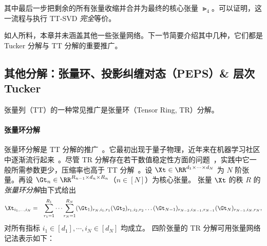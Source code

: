 其中最后一步把剩余的所有张量收缩并合并为最终的核心张量 $\Gt_4$。可以证明，这一流程与执行 TT-SVD \emph{完全}等价。

如人所料，本章并未涵盖其他一些张量网络。下一节简要介绍其中几种，它们都是 Tucker 分解与 TT 分解的重要推广。
\subsection{其他分解：张量环、投影纠缠对态（PEPS）\& 层次 Tucker}

张量列（TT）的一种常见推广是张量环（Tensor Ring, TR）分解。
\paragraph{张量环分解}
张量环分解是 TT 分解的推广~\citep{zhao2016tensor}。它最初出现于量子物理，近年来在机器学习社区中逐渐流行起来~\citep{wang2017efficient,wang2018wide,yuan2018higher}。尽管 TR 分解存在若干数值稳定性方面的问题~\citep{batselier2018trouble,chen2020tensor}，实践中它一般所需参数更少，压缩率也高于 TT 分解~\citep{mickelin2020algorithms}。设 $\Xt\in\RR^{d_1\times\dots\times d_N}$
    为 $N$ 阶张量。再设
    $\Gt_n\in\RR^{R_{n-1}\times d_n\times R_n}$（$n\in[N]$）为核心张量。
    张量 $\Xt$ 的秩 $R$ 的\emph{张量环分解}由下式给出
\begin{align*}
    \Xt_{i_1,\dots,i_N}=\hspace{0.25cm}\sum_{r_1=1}^{R_1}\dots\sum_{r_{N}=1}^{R_N}
    (\Gt_1)_{r_N,i_1,r_1} (\Gt_2)_{ r_1,i_2,r_2}\dots  (\Gt_{N-1})_{r_{N-2},i_{N-1},r_{N-1}} (\Gt_{N})_{r_{N-1},i_{N},r_N},
\end{align*}
对所有指标 $i_1\in[d_1],\cdots,i_N\in[d_N]$ 均成立。
四阶张量的 TR 分解可用张量网络记法表示如下：
